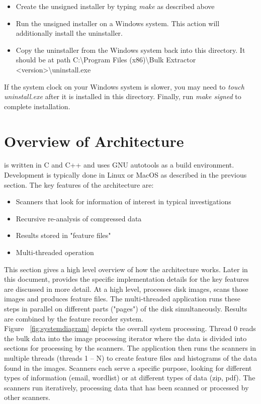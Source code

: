 \documentclass[11pt,fleqn]{article} %
\begin{document}
\begin{itemize}
	\item Create the unsigned installer by typing \textit{make} as described above
	\item Run the unsigned installer on a Windows system. This action will additionally install the uninstaller.
	\item Copy the uninstaller from the Windows system back into this directory. It should be at path 
		C:\textbackslash Program Files (x86)\textbackslash Bulk Extractor \textless version\textgreater \textbackslash uninstall.exe 
\end{itemize}

If the system clock on your Windows system is slower, you may need to \textit{touch uninstall.exe} after it is installed in this directory.
Finally, run \textit{make signed} to complete installation.
 \cite{installreadme}

\section{Overview of Architecture}
\bulk is written in C and C++ and uses GNU autotools as a build environment. Development is typically done in Linux or MacOS as described in the previous section.  The key features of the architecture are: 
\begin{itemize}
\item Scanners that look for information of interest in typical investigations
\item Recursive re-analysis of compressed data
\item Results stored in "feature files"
\item Multi-threaded operation
\end{itemize}
This section gives a high level overview of how the architecture works. Later in this document, \textbf{} \textbf{} provides the specific implementation details for the key features are discussed in more detail. At a high level, \bulk processes disk images, scans those images and produces feature files. The multi-threaded application runs these steps in parallel on different parts ("pages") of the disk simultaneously. Results are combined by the feature recorder system.\\

Figure ~\ref{fig:systemdiagram} depicts the overall system processing. Thread 0 reads the bulk data into the image processing iterator where the data is divided into sections for processing by the scanners. The application then runs the scanners in multiple threads (threads 1 -- N) to create feature files and histograms of the data found in the images. Scanners each serve a specific purpose, looking for different types of information (email, wordlist) or at different types of data (zip, pdf). The scanners run iteratively, processing data that has been scanned or processed by other scanners.\\
\end{document}

